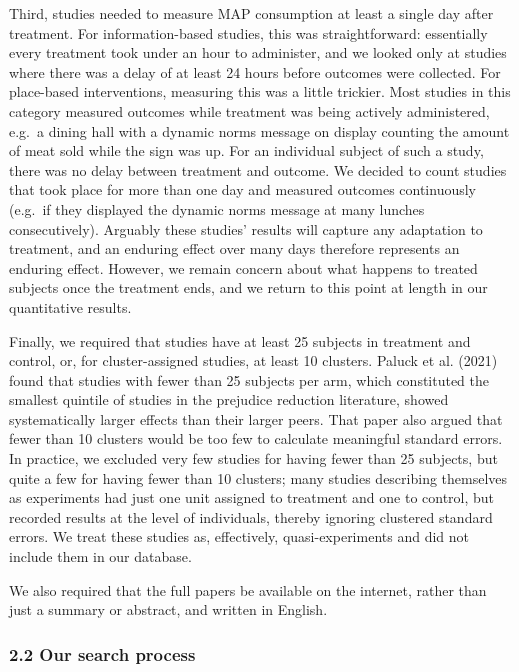 \documentclass[
  man]{apa6}
\begin{document}
Third, studies needed to measure MAP consumption at least a single day after treatment. For information-based studies, this was straightforward: essentially every treatment took under an hour to administer, and we looked only at studies where there was a delay of at least 24 hours before outcomes were collected. For place-based interventions, measuring this was a little trickier. Most studies in this category measured outcomes while treatment was being actively administered, e.g.~a dining hall with a dynamic norms message on display counting the amount of meat sold while the sign was up. For an individual subject of such a study, there was no delay between treatment and outcome. We decided to count studies that took place for more than one day and measured outcomes continuously (e.g.~if they displayed the dynamic norms message at many lunches consecutively). Arguably these studies' results will capture any adaptation to treatment, and an enduring effect over many days therefore represents an enduring effect. However, we remain concern about what happens to treated subjects once the treatment ends, and we return to this point at length in our quantitative results.

Finally, we required that studies have at least 25 subjects in treatment and control, or, for cluster-assigned studies, at least 10 clusters. Paluck et al. (2021) found that studies with fewer than 25 subjects per arm, which constituted the smallest quintile of studies in the prejudice reduction literature, showed systematically larger effects than their larger peers. That paper also argued that fewer than 10 clusters would be too few to calculate meaningful standard errors. In practice, we excluded very few studies for having fewer than 25 subjects, but quite a few for having fewer than 10 clusters; many studies describing themselves as experiments had just one unit assigned to treatment and one to control, but recorded results at the level of individuals, thereby ignoring clustered standard errors. We treat these studies as, effectively, quasi-experiments and did not include them in our database.

We also required that the full papers be available on the internet, rather than just a summary or abstract, and written in English.

\subsubsection{2.2 Our search process}\label{our-search-process}
\end{document}

